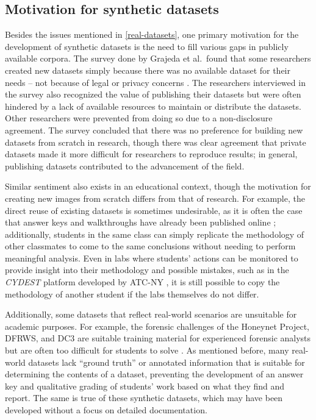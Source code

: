 \documentclass[letterpaper,12pt]{report}
\begin{document}
\subsection{Motivation for synthetic
datasets}\label{motivation-for-synthetic-datasets}

Besides the issues mentioned in \autoref{real-datasets}, one primary motivation for the development of synthetic
datasets is the need to fill various gaps in publicly available corpora.
The survey done by Grajeda et al.~found that some researchers created
new datasets simply because there was no available dataset for their
needs -- not because of legal or privacy concerns
\cite{grajedaAvailabilityDatasetsDigital2017}. The researchers
interviewed in the survey also recognized the value of publishing their
datasets but were often hindered by a lack of available resources to
maintain or distribute the datasets. Other researchers were prevented
from doing so due to a non-disclosure agreement. The survey concluded
that there was no preference for building new datasets from scratch in
research, though there was clear agreement that private datasets made it
more difficult for researchers to reproduce results; in general,
publishing datasets contributed to the advancement of the field.

Similar sentiment also exists in an educational context, though the
motivation for creating new images from scratch differs from that of
research. For example, the direct reuse of existing datasets is
sometimes undesirable, as it is often the case that answer keys and
walkthroughs have already been published online
\cite{woodsCreatingRealisticCorpora2011}; additionally, students in
the same class can simply replicate the methodology of other classmates
to come to the same conclusions without needing to perform meaningful
analysis. Even in labs where students' actions can be monitored to
provide insight into their methodology and possible mistakes, such as in
the \emph{CYDEST} platform developed by ATC-NY
\cite{bruecknerAutomatedComputerForensics2008}, it is still possible
to copy the methodology of another student if the labs themselves do not
differ.

Additionally, some datasets that reflect real-world scenarios are
unsuitable for academic purposes. For example, the forensic challenges
of the Honeynet Project, DFRWS, and DC3 are suitable training material
for experienced forensic analysts but are often too difficult for
students to solve \cite{woodsCreatingRealisticCorpora2011}. As
mentioned before, many real-world datasets lack ``ground truth'' or
annotated information that is suitable for determining the contents of a
dataset, preventing the development of an answer key and qualitative
grading of students' work based on what they find and report. The same
is true of these synthetic datasets, which may have been developed
without a focus on detailed documentation.
\end{document}
